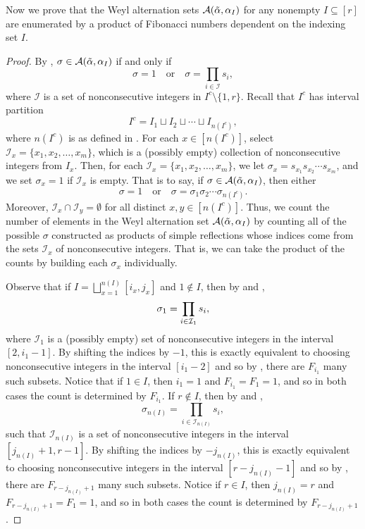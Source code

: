 \documentclass[10pt]{article}
\newcommand{\hr}[0]{\Tilde{\alpha}}
\newcommand{\newmu}[0]{\alpha_I}
\newcommand{\thealtset}[0]{\mathcal{A}(\hr,\newmu)}
\begin{document}
Now we prove that the Weyl alternation sets $\thealtset$ for any nonempty $I\subseteq[r]$ are enumerated by a product of Fibonacci numbers dependent on the indexing set $I$.
\corr
\begin{proof}
    By , $\sigma\in\thealtset$ if and only if 
    \[\sigma=1 \quad \text{or}\quad \sigma=\prod_{i\in\mathcal{I}}s_i,\]
    where $\mathcal{I}$ is a set of nonconsecutive integers in $I^c\setminus\{1,r\}$. Recall that $I^c$ has interval partition 
    \[I^c = I_1 \sqcup I_2 \sqcup \cdots \sqcup I_{n(I^c)},\]
    where $n(I^c)$ is as defined in .  
    For each $x\in [n(I^c)]$, select $\mathcal{I}_x=\{x_1,x_2,\ldots,x_m\}$, which is 
    a (possibly empty) collection of nonconsecutive integers from $I_x$.
    Then, for each $\mathcal{I}_x=\{x_1,x_2,\ldots,x_m\}$, we let $\sigma_x=s_{x_1}s_{x_2}\cdots s_{x_m}$, and we set $\sigma_x=1$ if $\mathcal{I}_x$ is empty. That is to say, if $\sigma\in\thealtset$, then either
    \[\sigma=1 \quad \text{or}\quad \sigma=\sigma_1\sigma_2\cdots\sigma_{n(I^c)}.\]
    Moreover, $\mathcal{I}_x\cap \mathcal{I}_y=\emptyset$ for all distinct $x,y\in[n(I^c)]$.
    Thus, we count the number of elements in the Weyl alternation set $\thealtset$ by counting all of the possible $\sigma$ constructed as products of simple reflections whose indices come from the sets $\mathcal{I}_x$ of nonconsecutive integers. 
    That is, we can take the product of the counts by building each $\sigma_x$ individually. 
    
    Observe that if $I=\bigsqcup_{x=1}^{n(I)}[i_x,j_x]$ and $1\notin I$, then by  and , 
    \begin{equation}
        \sigma_1=\prod_{i\in \mathcal{I}_1}s_i,\notag
    \end{equation} 
    where
    $\mathcal{I}_1$ is a (possibly empty) set of nonconsecutive integers in the interval $[2,i_1-1]$. By shifting the indices by $-1$, this is exactly equivalent to choosing nonconsecutive integers in the interval $[i_1-2]$ and so by , there are $F_{i_1}$ many such subsets.  
    Notice that if $1\in I$, then $i_1=1$ and $F_{i_1}=F_1=1$, and so in both cases the count is determined by $F_{i_1}$. 
    If $r\notin I$, then by  and ,
    \[\sigma_{n(I)}=\prod_{i\in\mathcal{I}_{n(I)}}s_i,\]
    such that $\mathcal{I}_{n(I)}$ is a set of nonconsecutive integers in the interval $[j_{n(I)}+1,r-1]$. By shifting the indices by $-j_{n(I)}$, this is exactly equivalent to choosing nonconsecutive integers in the interval $[r-j_{n(I)}-1]$ and so by , there are $F_{r-j_{n(I)}+1}$ many such subsets. 
    Notice if $r\in I$, then $j_{n(I)}=r$ and $F_{r-j_{n(I)}+1}=F_{1}=1$, and so in both cases the count is determined by $F_{r-j_{n(I)}+1}$.


\end{proof}
\end{document}
